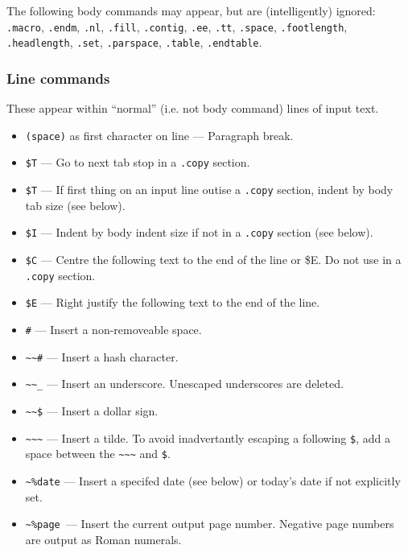 \documentclass[a4paper,twoside,11pt]{article}
\newcommand{\newpara}{\par\vspace{4mm}\noindent}
\newcommand{\textttc}[1]{\texttt{\textcolor{OurRed}{#1}}}
\begin{document}
\newpara
The following body commands may appear, but are (intelligently) ignored: \texttt{.macro},
\texttt{.endm}, \texttt{.nl}, \texttt{.fill},
\texttt{.contig}, \texttt{.ee}, \texttt{.tt}, \texttt{.space}, \texttt{.footlength}, \texttt{.headlength},
\texttt{.set}, \texttt{.parspace}, \texttt{.table}, \texttt{.endtable}.

\subsubsection{Line commands}
These appear within ``normal'' (i.e. not body command) lines of input text.
\begin{itemize}
\item \textttc{(space)} as first character on line --- Paragraph break.
\item \textttc{\$T} --- Go to next tab stop in a \texttt{.copy} section.
\item \textttc{\$T} --- If first thing on an input line outise a \texttt{.copy} section,
  indent by body tab size (see below).
\item \textttc{\$I} --- Indent by body indent size if not in a \texttt{.copy} section (see below).
\item \textttc{\$C} --- Centre the following text to the end of the line or \$E. Do not use in a \texttt{.copy} section.
\item \textttc{\$E} --- Right justify the following text to the end of the line.
\item \textttc{\#} --- Insert a non-removeable space.
\item \textttc{\textasciitilde\textasciitilde\#} --- Insert a hash character.
\item \textttc{\textasciitilde\textasciitilde\_} --- Insert an underscore. Unescaped underscores are deleted.
\item \textttc{\textasciitilde\textasciitilde\$} --- Insert a dollar sign.
\item \textttc{\textasciitilde\textasciitilde\textasciitilde} --- Insert a tilde.
  To avoid inadvertantly escaping a following \texttt{\$},
  add a space between the \texttt{\textasciitilde\textasciitilde\textasciitilde} and \texttt{\$}.
\item \textttc{\textasciitilde\%date} --- Insert a specifed date (see below) or today's date if not explicitly set.
\item \textttc{\textasciitilde\%page }--- Insert the current output page number.
  Negative page numbers are output as Roman
  numerals.
\end{itemize}
\end{document}
